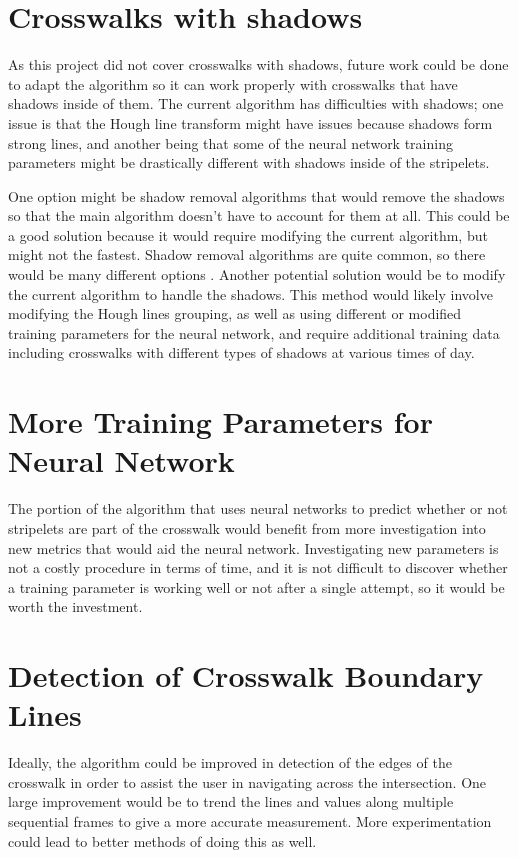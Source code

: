 \documentclass[12pt]{ucthesis}
\begin{document}
\section{Crosswalks with shadows}

As this project did not cover crosswalks with shadows, future work could be done to adapt the algorithm so it can work properly with crosswalks that have shadows inside of them. The current algorithm has difficulties with shadows; one issue is that the Hough line transform might have issues because shadows form strong lines, and another being that some of the neural network training parameters might be drastically different with shadows inside of the stripelets. 

One option might be shadow removal algorithms that would remove the shadows so that the main algorithm doesn't have to account for them at all. This could be a good solution because it would require modifying the current algorithm, but might not the fastest. Shadow removal algorithms are quite common, so there would be many different options \cite{shadowRemoval}. Another potential solution would be to modify the current algorithm to handle the shadows. This method would likely involve modifying the Hough lines grouping, as well as using different or modified training parameters for the neural network, and require additional training data including crosswalks with different types of shadows at various times of day. 

\section{More Training Parameters for Neural Network}

The portion of the algorithm that uses neural networks to predict whether or not stripelets are part of the crosswalk would benefit from more investigation into new metrics that would aid the neural network. Investigating new parameters is not a costly procedure in terms of time, and it is not difficult to discover whether a training parameter is working well or not after a single attempt, so it would be worth the investment.  

\section{Detection of Crosswalk Boundary Lines}

Ideally, the algorithm could be improved in detection of the edges of the crosswalk in order to assist the user in navigating across the intersection. One large improvement would be to trend the lines and values along multiple sequential frames to give a more accurate measurement. More experimentation could lead to better methods of doing this as well. 
\end{document}
